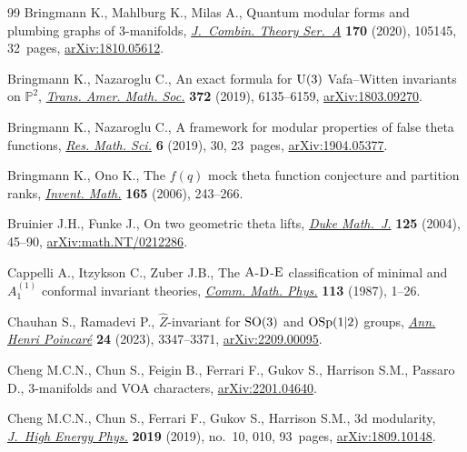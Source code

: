 \documentclass[pdftex]{sigma}
\theoremstyle{definition}
\numberwithin{equation}{section}
\begin{document}
\begin{thebibliography}{99}
Bringmann K., Mahlburg K., Milas A., Quantum modular forms and plumbing graphs
 of {3}-manifolds, \href{https://doi.org/10.1016/j.jcta.2019.105145}{\textit{J.~Combin. Theory Ser.~A}} \textbf{170} (2020),
 105145, 32~pages, \href{https://arxiv.org/abs/1810.05612}{arXiv:1810.05612}.

Bringmann K., Nazaroglu C., An exact formula for {$\rm U(3)$} {V}afa--{W}itten
 invariants on {$\mathbb P^2$}, \href{https://doi.org/10.1090/tran/7714}{\textit{Trans. Amer. Math. Soc.}} \textbf{372}
 (2019), 6135--6159, \href{https://arxiv.org/abs/1803.09270}{arXiv:1803.09270}.

Bringmann K., Nazaroglu C., A framework for modular properties of false theta
 functions, \href{https://doi.org/10.1007/s40687-019-0192-2}{\textit{Res. Math. Sci.}} \textbf{6} (2019), 30, 23~pages,
 \href{https://arxiv.org/abs/1904.05377}{arXiv:1904.05377}.

Bringmann K., Ono K., The {$f(q)$} mock theta function conjecture and partition
 ranks, \href{https://doi.org/10.1007/s00222-005-0493-5}{\textit{Invent. Math.}} \textbf{165} (2006), 243--266.

Bruinier J.H., Funke J., On two geometric theta lifts, \href{https://doi.org/10.1215/S0012-7094-04-12513-8}{\textit{Duke Math.~J.}}
 \textbf{125} (2004), 45--90, \href{https://arxiv.org/abs/math.NT/0212286}{arXiv:math.NT/0212286}.

Cappelli A., Itzykson C., Zuber J.B., The {${\rm A}$}-{${\rm D}$}-{${\rm E}$}
 classification of minimal and {$A^{(1)}_1$} conformal invariant theories,
 \href{https://doi.org/10.1007/BF01221394}{\textit{Comm. Math. Phys.}} \textbf{113} (1987), 1--26.

Chauhan S., Ramadevi P., {$\hat Z$}-invariant for ${\rm SO}(3)$ and ${\rm
 OSp}(1|2)$ groups, \href{https://doi.org/10.1007/s00023-023-01332-y}{\textit{Ann. Henri Poincar\'e}} \textbf{24} (2023),
 3347--3371, \href{https://arxiv.org/abs/2209.00095}{arXiv:2209.00095}.

Cheng M.C.N., Chun S., Feigin B., Ferrari F., Gukov S., Harrison S.M., Passaro
 D., 3-manifolds and {VOA} characters, \href{https://arxiv.org/abs/2201.04640}{arXiv:2201.04640}.

Cheng M.C.N., Chun S., Ferrari F., Gukov S., Harrison S.M., 3d modularity,
 \href{https://doi.org/10.1007/jhep10(2019)010}{\textit{J.~High Energy Phys.}} \textbf{2019} (2019), no.~10, 010, 93~pages,
 \href{https://arxiv.org/abs/1809.10148}{arXiv:1809.10148}.


\end{thebibliography}
\end{document}
